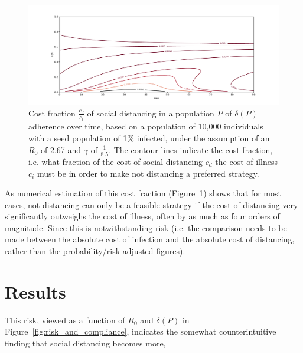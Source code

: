 \documentclass{article}
\begin{document}
\begin{figure}
	\includegraphics[width=\linewidth]{figures/cost_fraction}
	\caption{Cost fraction $\frac{c_d}{c_i}$ of social distancing in a population $P$ of $\delta(P)$ adherence over time, based on a population of 10,000 individuals with a seed population of 1\% infected, under the assumption of an $R_0$ of 2.67 and $\gamma$ of $\frac{1}{8.5}$. The contour lines indicate the cost fraction, i.e. what fraction of the cost of social distancing $c_d$ the cost of illness $c_i$ must be in order to make not distancing a preferred strategy.}
	\label{fig:cost_fraction}
\end{figure}

As numerical estimation of this cost fraction (Figure~\ref{fig:cost_fraction}) shows that for most cases, not distancing can only be a feasible strategy if the cost of distancing very significantly outweighs the cost of illness, often by as much as four orders of magnitude. Since this is notwithstanding risk (i.e. the comparison needs to be made between the absolute cost of infection and the absolute cost of distancing, rather than the probability/risk-adjusted figures).



\section{Results} %
\label{sec:results}




This risk, viewed as a function of $R_0$ and $\delta(P)$ in Figure~\ref{fig:risk_and_compliance}, indicates the somewhat counterintuitive finding that social distancing becomes more, 




\end{document}
